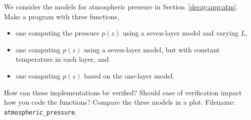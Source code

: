 \documentclass[graybox,sectrefs,envcountresetchap,open=right,final]{svmonodo}
\makeatletter
\newenvironment{doconceexercise}{}{}
\newcounter{doconceexercisecounter}%
\newcommand\listofexercises{
\chapter*{List of Exercises, Problems, and Projects
          \@mkboth{List of Exercises, Problems, and Projects}{List of Exercises, Problems, and Projects}}
\markboth{List of Exercises, Problems, and Projects}{List of Exercises, Problems, and Projects}
\@starttoc{loe}
}
\makeatother
\begin{document}
\begin{doconceexercise}

                
\label{decay:app:exer:atm1}

We consider the models for atmospheric pressure in
Section~\ref{decay:app:atm}.
Make a program with three functions,

\begin{itemize}
 \item one computing the pressure $p(z)$ using a seven-layer model and varying $L$,

 \item one computing $p(z)$ using a seven-layer model, but with constant temperature in each layer, and

 \item one computing $p(z)$ based on the one-layer model.
\end{itemize}

\noindent
How can these implementations be verified? Should ease of verification
impact how you code the functions?
Compare the three models in a plot.
\noindent Filename: \Verb!atmospheric_pressure!.

\end{doconceexercise}
\end{document}
